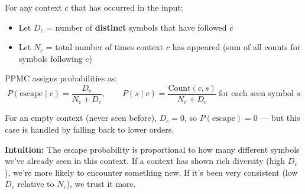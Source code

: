 \begin{definitionbox}
For any context $c$ that has occurred in the input:
\begin{itemize}
    \item Let $D_c$ = number of \textbf{distinct} symbols that have followed $c$
    \item Let $N_c$ = total number of times context $c$ has appeared 
          (sum of all counts for symbols following $c$)
\end{itemize}
PPMC assigns probabilities as:
\[
P(\text{escape} \mid c) = \frac{D_c}{N_c + D_c}, \qquad
P(s \mid c) = \frac{\text{Count}(c,s)}{N_c + D_c} \ \text{for each seen symbol } s
\]

For an empty context (never seen before), $D_c = 0$, so $P(\text{escape}) = 0$ — 
but this case is handled by falling back to lower orders.
\end{definitionbox}

\textbf{Intuition:} The escape probability is proportional to how many different
symbols we've already seen in this context. If a context has shown rich diversity
(high $D_c$), we're more likely to encounter something new. If it's been very
consistent (low $D_c$ relative to $N_c$), we trust it more.


